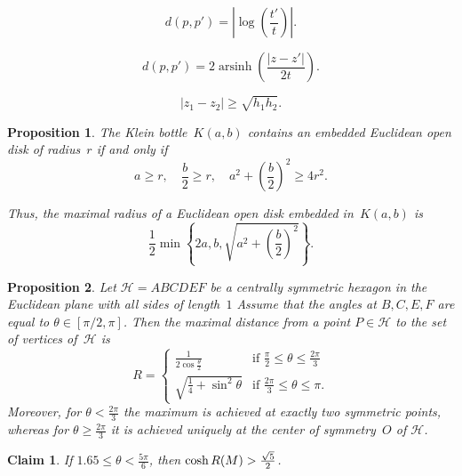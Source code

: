 \documentclass[10pt,a4paper]{amsart}
\newtheorem{claim}{Claim}
\newtheorem{proposition}{Proposition}
\newcommand\RR{{\rm R}}
\DeclareMathOperator{\arsinh}{arsinh}
\begin{document}
\begin{equation} \label{eq:hyp-eucl2} 
d(p,p') = \left| \log \left( \frac{t'}{t} \right) \right|.
\end{equation}

\begin{equation} \label{eq:hyp-eucl3} 
d(p,p') = 2 \arsinh \left( \frac{|z-z'|}{2t} \right).
\end{equation}

\begin{equation} \label{eq:h1h2}
| z_1 - z_2 | \geq \sqrt{h_1 h_2}.
\end{equation}

\begin{proposition} \label{prop:diskK}
The Klein bottle~$K(a,b)$ contains an embedded Euclidean open disk of radius~$r$ if and only if
\[
a \geq r, \quad \frac{b}{2} \geq r, \quad a^2 + \left(\frac{b}{2} \right)^2 \geq 4r^2.
\]

Thus, the maximal radius of a Euclidean open disk embedded in~$K(a,b)$ is
\[
\frac{1}{2} \min \left\{ 2a,b,\sqrt{a^2+\left( \frac{b}{2} \right)^2} \right\}.
\]
\end{proposition}

\begin{proposition} \label{prop:hexagon}
Let $\mathcal{H}=ABCDEF$ be a centrally symmetric hexagon in the Euclidean plane with all sides of length~$1$
Assume that the angles at $B,C,E,F$ are equal to $\theta \in [\pi/2,\pi]$. 
Then the maximal distance from a point $P \in \mathcal{H}$ to the set of vertices of~$\mathcal{H}$ is
\[
R=
\begin{cases}
\frac{1}{2\cos \frac{\theta}{2}} & \text{if } \frac{\pi}{2} \leq \theta \leq \frac{2\pi}{3} \\
\sqrt{\frac{1}{4}+\sin^2 \theta} & \text{if } \frac{2\pi}{3} \leq \theta \leq \pi.
\end{cases}
\]
Moreover, for $\theta<\frac{2\pi}{3}$ the maximum is achieved at exactly two symmetric points, whereas for $\theta \geq \frac{2\pi}{3}$ it is achieved uniquely at the center of symmetry~$O$ of $\mathcal{H}$.
\end{proposition}

\begin{claim} \label{claim:1.65}
If $1.65 \leq \theta < \frac{5\pi}{6}$, then $\cosh \RR(M) > \frac{\sqrt{5}}{2}$.
\end{claim}
\end{document}
